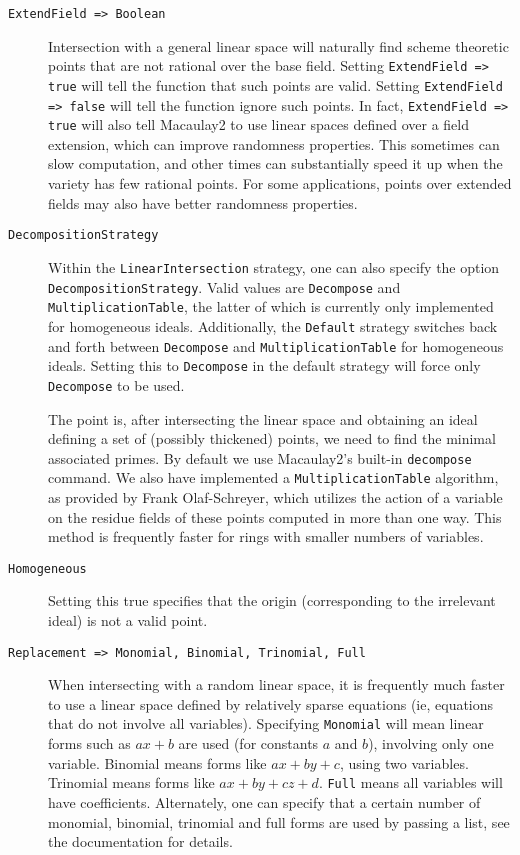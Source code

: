 \documentclass[11pt]{amsart}
\theoremstyle{definition}
\begin{document}
\begin{description}
    \item[\tt ExtendField => Boolean] 

    Intersection with a general linear space will naturally find scheme theoretic points that are not rational over the base field.  
    Setting {\tt ExtendField => true} will tell the function that such points are valid.  Setting {\tt ExtendField => false} will tell the function ignore such points.  
    In fact, {\tt ExtendField => true} will also tell Macaulay2 to use linear spaces defined over a field extension, which can improve randomness properties.
    This sometimes can slow computation, and other times can substantially speed it up when the variety has few rational points.  For some applications, points over extended fields may also have better randomness properties.

    \item[\tt DecompositionStrategy]  Within the {\tt LinearIntersection} strategy, one can also specify the option {\tt DecompositionStrategy}.  Valid values are {\tt Decompose} and {\tt MultiplicationTable}, the latter of which is currently only implemented for homogeneous ideals.  Additionally, the {\tt Default} strategy switches back and forth between {\tt Decompose} and {\tt MultiplicationTable} for homogeneous ideals.  Setting this to {\tt Decompose} in the default strategy will force only {\tt Decompose} to be used.
    
    The point is, after intersecting the linear space and obtaining an ideal defining a set of (possibly thickened) points, we need to find the minimal associated primes.  By default we use Macaulay2's built-in {\tt decompose} command.  We also have implemented a {\tt MultiplicationTable} algorithm, as provided by Frank Olaf-Schreyer, which utilizes the action of a variable on the residue fields of these points computed in more than one way.  This method is frequently faster for rings with smaller numbers of variables.

    \item[\tt Homogeneous]  Setting this true specifies that the origin (corresponding to the irrelevant ideal) is not a valid point.

    \item[\tt Replacement => Monomial, Binomial, Trinomial, Full]
        When intersecting with a random linear space, it is frequently much faster to use a linear space defined by relatively sparse equations (ie, equations that do not involve all variables).   Specifying {\tt Monomial} will mean linear forms such as $ax + b$ are used (for constants $a$ and $b$), involving only one variable.  Binomial means forms like $ax + by + c$, using two variables.  Trinomial means forms like $ax + by + cz + d$.  {\tt Full} means all variables will have coefficients.  Alternately, one can specify that a certain number of monomial, binomial, trinomial and full forms are used by passing a list, see the documentation for details.


\end{description}
\end{document}
